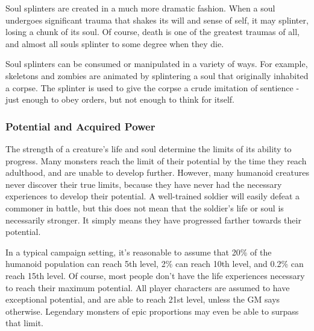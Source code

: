             Soul splinters are created in a much more dramatic fashion.
            When a soul undergoes significant trauma that shakes its will and sense of self, it may splinter, losing a chunk of its soul.
            Of course, death is one of the greatest traumas of all, and almost all souls splinter to some degree when they die.

            Soul splinters can be consumed or manipulated in a variety of ways.
            For example, skeletons and zombies are animated by splintering a soul that originally inhabited a corpse.
            The splinter is used to give the corpse a crude imitation of sentience - just enough to obey orders, but not enough to think for itself.

        \subsubsection{Potential and Acquired Power}
            The strength of a creature's life and soul determine the limits of its ability to progress.
            Many monsters reach the limit of their potential by the time they reach adulthood, and are unable to develop further.
            However, many humanoid creatures never discover their true limits, because they have never had the necessary experiences to develop their potential.
            A well-trained soldier will easily defeat a commoner in battle, but this does not mean that the soldier's life or soul is necessarily stronger.
            It simply means they have progressed farther towards their potential.

            In a typical campaign setting, it's reasonable to assume that 20\% of the humanoid population can reach 5th level, 2\% can reach 10th level, and 0.2\% can reach 15th level.
            Of course, most people don't have the life experiences necessary to reach their maximum potential.
            All player characters are assumed to have exceptional potential, and are able to reach 21st level, unless the GM says otherwise.
            Legendary monsters of epic proportions may even be able to surpass that limit.


